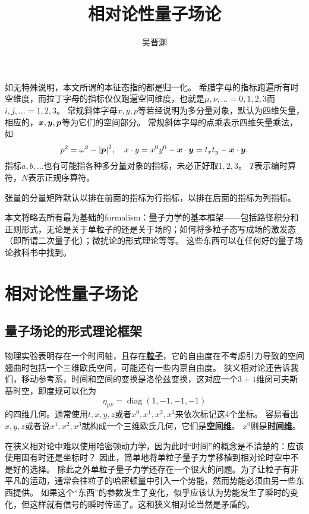 \documentclass[hyperref, UTF8, a4paper]{ctexbook}
\title{相对论性量子场论}
\author{吴晋渊}
\DeclareMathOperator{\diag}{diag}
\newcommand{\concept}[1]{\underline{\textbf{#1}}}
\begin{document}
\maketitle

\vspace{2em}

如无特殊说明，本文所谓的本征态指的都是归一化。
希腊字母的指标跑遍所有时空维度，而拉丁字母的指标仅仅跑遍空间维度，也就是$\mu, \nu, \ldots = 0, 1, 2, 3$而$i, j, \ldots = 1, 2, 3$。
常规斜体字母$x, y, p$等若经说明为多分量对象，默认为四维矢量，相应的，$\vb*{x}, \vb*{y}, \vb*{p}$等为它们的空间部分。
常规斜体字母的点乘表示四维矢量乘法，如
\[
    p^2 = \omega^2 - \abs{\vb*{p}}^2, \quad x \cdot y = x^0 y^0 - \vb*{x} \cdot \vb*{y} = t_x t_y - \vb*{x} \cdot \vb*{y}.
\]
指标$a,b,\ldots$也有可能指各种多分量对象的指标，未必正好取$1, 2, 3$。
$T$表示编时算符，$N$表示正规序算符。

张量的分量矩阵默认以排在前面的指标为行指标，以排在后面的指标为列指标。

本文将略去所有最为基础的formalism：量子力学的基本框架——包括路径积分和正则形式，无论是关于单粒子的还是关于场的；如何将多粒子态写成场的激发态（即所谓二次量子化）；微扰论的形式理论等等。
这些东西可以在任何好的量子场论教科书中找到。

\part{相对论性量子场论}

\chapter{量子场论的形式理论框架}

物理实验表明存在一个时间轴，且存在\concept{粒子}，它的自由度在不考虑引力导致的空间翘曲时包括一个三维欧氏空间，可能还有一些内禀自由度。
狭义相对论还告诉我们，移动参考系，时间和空间的变换是洛伦兹变换，这对应一个$3+1$维闵可夫斯基时空，即度规可以化为
\[
    \eta_{\mu\nu} = \diag (1, -1, -1, -1)
\]
的四维几何。通常使用$t, x, y, z$或者$x^0, x^1, x^2, x^3$来依次标记这4个坐标。
容易看出$x, y, z$或者说$x^1, x^2, x^3$就构成一个三维欧氏几何，它们是\concept{空间维}。%
$x^0$则是\concept{时间维}。

在狭义相对论中难以使用哈密顿动力学，因为此时“时间”的概念是不清楚的：应该使用固有时还是坐标时？
因此，简单地将单粒子量子力学移植到相对论时空中不是好的选择。
除此之外单粒子量子力学还存在一个很大的问题。为了让粒子有非平凡的运动，通常会往粒子的哈密顿量中引入一个势能，然而势能必须由另一些东西提供。
如果这个“东西”的参数发生了变化，似乎应该认为势能发生了瞬时的变化，但这样就有信号的瞬时传递了。这和狭义相对论当然是矛盾的。
\end{document}
